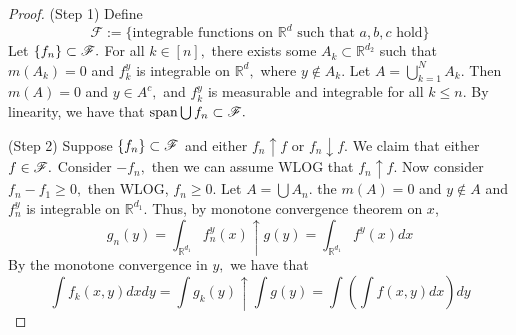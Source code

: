 \documentclass[10pt, oneside]{article}
\newcommand{\bbR}{\mathbb{R}}
\theoremstyle{definition}
\begin{document}
\begin{proof}
(Step 1) Define 
\[\mathcal{F}:= \{\text{integrable functions on $\bbR^d$ such that $a,b,c$ hold}\}\] Let $\{f_n\} \subset \cal F.$ For all $k \in [n],$ there exists some $A_k \subset \bbR^{d_2}$ such that $m(A_k) = 0$ and $f_k^y$ is integrable on $\bbR^d,$ where $y\notin A_k.$ Let $A = \bigcup_{k=1}^N A_k.$ Then $m(A) = 0$ and $y\in A^c,$ and $f_k^y$ is measurable and integrable for all $k \leq n.$  By linearity, we have that $\text{span}\bigcup f_n\subset \cal F.$

(Step 2) Suppose $\{f_n\} \subset \cal F$ and either $f_n\uparrow f$ or $f_n \downarrow f.$ We claim that either $f\in \cal F.$ Consider $-f_n,$ then we can assume WLOG that $f_n \uparrow f.$ Now consider $f_n - f_1 \geq 0,$ then WLOG, $f_n \geq 0.$ Let $A = \bigcup A_n.$ the $m(A) = 0$ and $y\notin A$ and $f_n^y$ is integrable on $\bbR^{d_1}.$ Thus, by monotone convergence theorem on $x$,
\[g_n(y) = \int_{\bbR^{d_1}} f_n^y(x) \uparrow g(y) = \int_{\bbR^{d_1}}f^y(x)dx\] By the monotone convergence in $y,$ we have that 
\[\int f_k(x,y)dxdy=\int g_k(y)\uparrow \int g(y)  = \int  \left(\int f(x,y)dx\right)dy\]


\end{proof}
\end{document}
